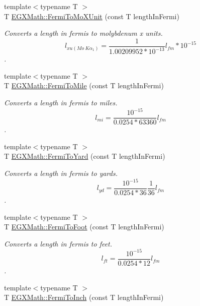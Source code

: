 \begin{DoxyCompactItemize}
{\footnotesize template$<$typename T $>$ }\\T \mbox{\hyperlink{group___e_g_x_math-_conversions-_length_conversions-_non-_s_i-_fermi-_non-_s_i_ga8555a46e14c4a759e0b04a54485d679e}{E\+G\+X\+Math\+::\+Fermi\+To\+Mo\+X\+Unit}} (const T length\+In\+Fermi)
\begin{DoxyCompactList}\small\item\em Converts a length in fermis to molybdenum x units. \[ l_{xu(Mo\ K\alpha_1)}=\frac{1}{1.00209952*10^{-13}} l_{fm} * 10^{-15}\]. \end{DoxyCompactList}\item 
{\footnotesize template$<$typename T $>$ }\\T \mbox{\hyperlink{group___e_g_x_math-_conversions-_length_conversions-_non-_s_i-_fermi-_imperial_gaf74233f6bd05bd9a63a486813d3b4bf8}{E\+G\+X\+Math\+::\+Fermi\+To\+Mile}} (const T length\+In\+Fermi)
\begin{DoxyCompactList}\small\item\em Converts a length in fermis to miles. \[ l_{mi}=\frac{10^{-15}}{0.0254 * 63360} l_{fm} \]. \end{DoxyCompactList}\item 
{\footnotesize template$<$typename T $>$ }\\T \mbox{\hyperlink{group___e_g_x_math-_conversions-_length_conversions-_non-_s_i-_fermi-_imperial_ga5dce34089b9de102570c5c9c68b58176}{E\+G\+X\+Math\+::\+Fermi\+To\+Yard}} (const T length\+In\+Fermi)
\begin{DoxyCompactList}\small\item\em Converts a length in fermis to yards. \[ l_{yd}= \frac{10^{-15}}{0.0254 * 36} \frac{1}{36} l_{fm} \]. \end{DoxyCompactList}\item 
{\footnotesize template$<$typename T $>$ }\\T \mbox{\hyperlink{group___e_g_x_math-_conversions-_length_conversions-_non-_s_i-_fermi-_imperial_ga22e9d7b13f45ef14c3963254caff7d78}{E\+G\+X\+Math\+::\+Fermi\+To\+Foot}} (const T length\+In\+Fermi)
\begin{DoxyCompactList}\small\item\em Converts a length in fermis to feet. \[ l_{ft}= \frac{10^{-15}}{0.0254 * 12} l_{fm} \]. \end{DoxyCompactList}\item 
{\footnotesize template$<$typename T $>$ }\\T \mbox{\hyperlink{group___e_g_x_math-_conversions-_length_conversions-_non-_s_i-_fermi-_imperial_gaacac85ebc839bc27889740d9ae608259}{E\+G\+X\+Math\+::\+Fermi\+To\+Inch}} (const T length\+In\+Fermi)

\end{DoxyCompactItemize}
